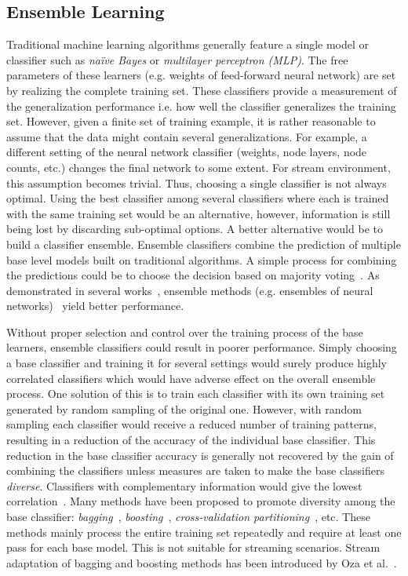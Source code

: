 \subsection{Ensemble Learning}
Traditional machine learning algorithms generally feature a single model or classifier such as \textit{na\"ive Bayes} or \textit{multilayer perceptron (MLP)}. The free parameters of these learners (e.g. weights of feed-forward neural network) are set by realizing the complete training set. These classifiers provide a measurement of the generalization performance i.e. how well the classifier generalizes the training set. However, given a finite set of training example, it is rather reasonable to assume that the data might contain several generalizations. For example, a different setting of the neural network classifier (weights, node layers, node counts, etc.) changes the final network to some extent. For stream environment, this assumption becomes trivial. Thus, choosing a single classifier is not always optimal. Using the best classifier among several classifiers where each is trained with the same training set would be an alternative, however, information is still being lost by discarding sub-optimal options. A better alternative would be to build a classifier ensemble. Ensemble classifiers combine the prediction of multiple base level models built on traditional algorithms. A simple process for combining the predictions could be to choose the decision based on majority voting~\cite{parhami94:voting}. As demonstrated in several works~\cite{breiman93:regression, schapire90:whyens, wolpert92:whyens}, ensemble methods (e.g. ensembles of neural networks)~\cite{hansen90:ensNN, tumer99:whyens} yield better performance. 

Without proper selection and control over the training process of the base learners, ensemble classifiers could result in poorer performance. Simply choosing a base classifier and training it for several settings would surely produce highly correlated classifiers which would have adverse effect on the overall ensemble process. One solution of this  is to train each classifier with its own training set generated by random sampling of the original one. However, with random sampling each classifier would receive a reduced number of training patterns, resulting in a reduction of the accuracy of the individual base classifier. This reduction in the base classifier accuracy is generally not recovered by the gain of combining the classifiers unless measures are taken to make the base classifiers \textit{diverse}. Classifiers with complementary information would give the lowest correlation~\cite{breiman93:regression, tumer99:whyens}. Many methods have been proposed to promote diversity among the base classifier: \textit{bagging}~\cite{breiman94:bagging}, \textit{boosting}~\cite{drucker94:boosting, freund97:boosting, oza99:whyens}, \textit{cross-validation partitioning}~\cite{krogh95:ensNNcv, tumer99:whyens}, etc. These methods mainly process the entire training set repeatedly and require at least one pass for each base model. This is not suitable for streaming scenarios. Stream adaptation of bagging and boosting methods has been introduced by Oza et al.~\cite{oza01:obagboost,oza01:thesis}.

